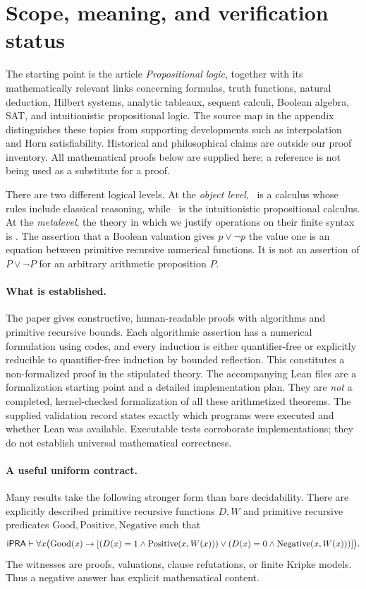 \section{Scope, meaning, and verification status}\label{sec:scope}

The starting point is the article \emph{Propositional logic}, together with its
mathematically relevant links concerning formulas, truth functions, natural
deduction, Hilbert systems, analytic tableaux, sequent calculi, Boolean algebra,
SAT, and intuitionistic propositional logic. The source map in the appendix
distinguishes these topics from supporting developments such as interpolation
and Horn satisfiability. Historical and philosophical claims are outside our
proof inventory. All mathematical proofs below are supplied here; a reference
is not being used as a substitute for a proof.

There are two different logical levels. At the \emph{object level}, \CPC\ is a
calculus whose rules include classical reasoning, while \IPC\ is the
intuitionistic propositional calculus. At the \emph{metalevel}, the theory in
which we justify operations on their finite syntax is \ipra. The assertion
that a Boolean valuation gives $p\vee\neg p$ the value one is an equation
between primitive recursive numerical functions. It is not an assertion of
$P\vee\neg P$ for an arbitrary arithmetic proposition $P$.

\paragraph{What is established.}
The paper gives constructive, human-readable proofs with algorithms and
primitive recursive bounds. Each algorithmic assertion has a numerical
formulation using codes, and every induction is either quantifier-free or
explicitly reducible to quantifier-free induction by bounded reflection.
This constitutes a non-formalized proof in the stipulated theory. The
accompanying Lean files are a formalization starting point and a detailed
implementation plan. They are \emph{not} a completed, kernel-checked
formalization of all these arithmetized theorems. The supplied validation
record states exactly which programs were executed and whether Lean was
available. Executable tests corroborate implementations; they do not establish
universal mathematical correctness.

\paragraph{A useful uniform contract.}
Many results take the following stronger form than bare decidability. There
are explicitly described primitive recursive functions $D,W$ and primitive
recursive predicates $\mathrm{Good},\mathrm{Positive},\mathrm{Negative}$ such that
\[
 \mathsf{iPRA}\vdash \forall x\bigl(\mathrm{Good}(x)\to
 [(D(x)=1\wedge\mathrm{Positive}(x,W(x)))\vee
  (D(x)=0\wedge\mathrm{Negative}(x,W(x)))]\bigr).
\]
The witnesses are proofs, valuations, clause refutations, or finite Kripke
models. Thus a negative answer has explicit mathematical content.

